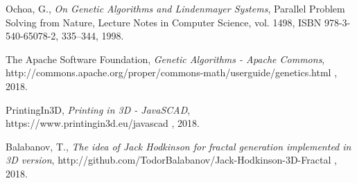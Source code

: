 \documentclass{llncs}
\begin{document}
\begin{thebibliography}{99}

 Ochoa, G., \textit{On Genetic Algorithms and Lindenmayer Systems}, Parallel Problem Solving from Nature, Lecture Notes in Computer Science, vol. 1498, ISBN 978-3-540-65078-2, 335--344, 1998.

 The Apache Software Foundation, \textit{Genetic Algorithms - Apache Commons}, http://commons.apache.org/proper/commons-math/userguide/genetics.html , 2018.

 PrintingIn3D, \textit{Printing in 3D - JavaSCAD}, https://www.printingin3d.eu/javascad , 2018.

 Balabanov, T., \textit{The idea of Jack Hodkinson for fractal generation implemented in 3D version}, http://github.com/TodorBalabanov/Jack-Hodkinson-3D-Fractal , 2018.

\end{thebibliography}
\end{document}
